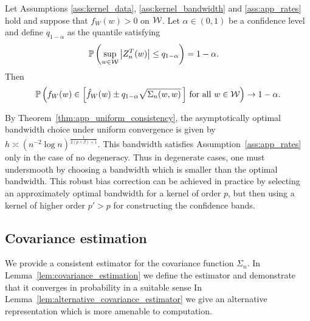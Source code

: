 \begin{theorem}
  \label{thm:app_infeasible_ucb}

  Let Assumptions \ref{ass:kernel_data}, \ref{ass:kernel_bandwidth}
  and \ref{ass:app_rates}
  hold and suppose that $f_W(w) > 0$ on $\mathcal{W}$.
  Let $\alpha \in (0,1)$ be a confidence level
  and define $q_{1-\alpha}$ as the quantile
  satisfying
  \begin{align*}
    \mathbb{P}\left(
      \sup_{w \in \mathcal{W}}
      \left| Z_n^T(w) \right|
      \leq q_{1-\alpha}
    \right)
    &=
    1 - \alpha.
  \end{align*}
  Then
  \begin{align*}
    \mathbb{P}\left(
      f_W(w)
      \in
      \left[
        \hat f_W(w)
        \pm
        q_{1-\alpha}
        \sqrt{\Sigma_n(w,w)}
      \, \right]
      \, \textup{for all }
      w \in \mathcal{W}
    \right)
    \to 1 - \alpha.
  \end{align*}
\end{theorem}

\begin{remark}

  By Theorem~\ref{thm:app_uniform_consistency},
  the asymptotically optimal bandwidth choice
  under uniform convergence is given by
  $h \asymp (n^{-2} \log n)^{\frac{1}{2(p \wedge \beta)+1}}$.
  This bandwidth satisfies Assumption~\ref{ass:app_rates}
  only in the case of no degeneracy.
  Thus in degenerate cases, one must undersmooth by choosing
  a bandwidth which is smaller than the optimal bandwidth.
  This robust bias correction can be achieved in practice by selecting an
  approximately optimal bandwidth
  for a kernel of order $p$, but then using a kernel of higher order
  $p' > p$ for constructing the confidence bands.

\end{remark}

\subsection{Covariance estimation}

We provide a consistent estimator for the
covariance function $\Sigma_n$.
In Lemma~\ref{lem:covariance_estimation}
we define the estimator and demonstrate that it
converges in probability in a suitable sense
In Lemma~\ref{lem:alternative_covariance_estimator}
we give an alternative representation
which is more amenable to computation.

